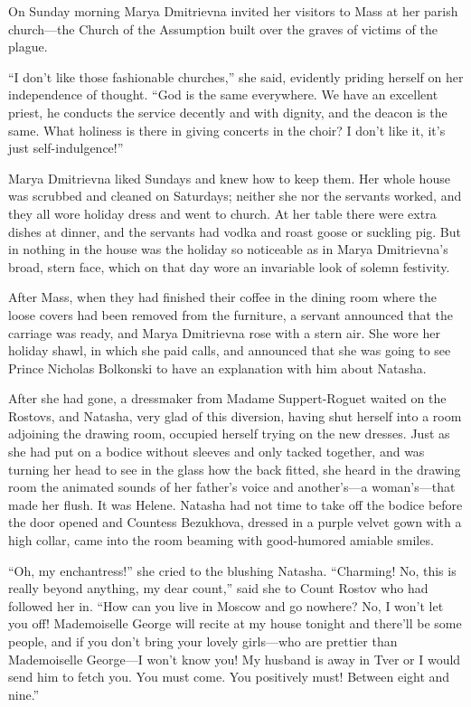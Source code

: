 On Sunday morning Marya Dmitrievna invited her visitors to Mass
at her parish church---the Church of the Assumption built over
the graves of victims of the plague.

``I don't like those fashionable churches,'' she said, evidently
priding herself on her independence of thought. ``God is the same
everywhere. We have an excellent priest, he conducts the service
decently and with dignity, and the deacon is the same. What
holiness is there in giving concerts in the choir? I don't like
it, it's just self-indulgence!''

Marya Dmitrievna liked Sundays and knew how to keep them. Her
whole house was scrubbed and cleaned on Saturdays; neither she
nor the servants worked, and they all wore holiday dress and went
to church. At her table there were extra dishes at dinner, and
the servants had vodka and roast goose or suckling pig. But in
nothing in the house was the holiday so noticeable as in Marya
Dmitrievna's broad, stern face, which on that day wore an
invariable look of solemn festivity.

After Mass, when they had finished their coffee in the dining
room where the loose covers had been removed from the furniture,
a servant announced that the carriage was ready, and Marya
Dmitrievna rose with a stern air. She wore her holiday shawl, in
which she paid calls, and announced that she was going to see
Prince Nicholas Bolkonski to have an explanation with him about
Natasha.

After she had gone, a dressmaker from Madame Suppert-Roguet
waited on the Rostovs, and Natasha, very glad of this diversion,
having shut herself into a room adjoining the drawing room,
occupied herself trying on the new dresses. Just as she had put
on a bodice without sleeves and only tacked together, and was
turning her head to see in the glass how the back fitted, she
heard in the drawing room the animated sounds of her father's
voice and another's---a woman's---that made her flush. It was
Helene. Natasha had not time to take off the bodice before the
door opened and Countess Bezukhova, dressed in a purple velvet
gown with a high collar, came into the room beaming with
good-humored amiable smiles.

``Oh, my enchantress!'' she cried to the blushing
Natasha. ``Charming! No, this is really beyond anything, my dear
count,'' said she to Count Rostov who had followed her in. ``How
can you live in Moscow and go nowhere? No, I won't let you off!
Mademoiselle George will recite at my house tonight and there'll
be some people, and if you don't bring your lovely girls---who
are prettier than Mademoiselle George---I won't know you!  My
husband is away in Tver or I would send him to fetch you. You
must come. You positively must! Between eight and nine.''

